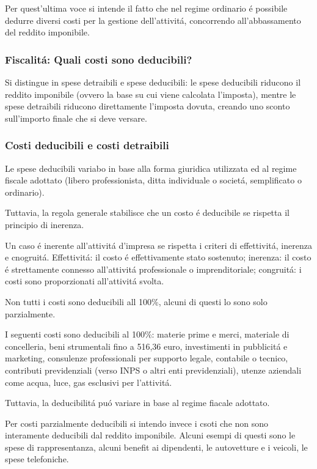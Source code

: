 \documentclass{article}
\begin{document}
Per quest'ultima voce si intende il fatto che nel regime ordinario \'e possibile dedurre diversi costi per la gestione dell'attivit\'a, concorrendo all'abbassamento del reddito imponibile.

\subsubsection{Fiscalit\'a: Quali costi sono deducibili?}
Si distingue in spese detraibili e spese deducibili: 
le spese deducibili riducono il reddito imponibile (ovvero la base su cui viene calcolata l'imposta),
mentre le spese detraibili riducono direttamente l'imposta dovuta, creando uno sconto sull'importo finale che si deve versare.

\subsubsection{Costi deducibili e costi detraibili}
Le spese deducibili variabo in base  alla forma giuridica utilizzata ed al regime fiscale adottato  (libero professionista, ditta individuale o societ\'a, semplificato o ordinario). 

Tuttavia, la regola generale stabilisce che un costo \'e deducibile se rispetta il principio di inerenza.

Un caso \'e inerente all'attivit\'a d'impresa se rispetta i criteri di effettivit\'a, inerenza e cnogruit\'a. 
Effettivit\'a: il costo \'e effettivamente stato sostenuto; inerenza: il costo \'e strettamente connesso all'attivit\'a professionale o imprenditoriale; congruit\'a: i costi sono proporzionati all'attivit\'a svolta.

Non tutti i costi sono deducibili all 100\%, alcuni di questi lo sono solo parzialmente.

I seguenti costi sono deducibili al 100\%: materie prime e merci, materiale di concelleria, beni strumentali fino a 516,36 euro, investimenti in pubblicit\'a e marketing, consulenze professionali per supporto legale, contabile o tecnico, contributi previdenziali (verso INPS o altri enti previdenziali), utenze aziendali come acqua, luce, gas esclusivi per l'attivit\'a.

Tuttavia, la deducibilit\'a pu\'o variare in base al regime fiacale adottato.

Per costi parzialmente deducibili si intendo invece i csoti che non sono interamente deducibili dal reddito imponibile. Alcuni esempi di questi sono le spese di rappresentanza, alcuni benefit ai dipendenti, le autovetture e i veicoli, le spese telefoniche.
\end{document}
